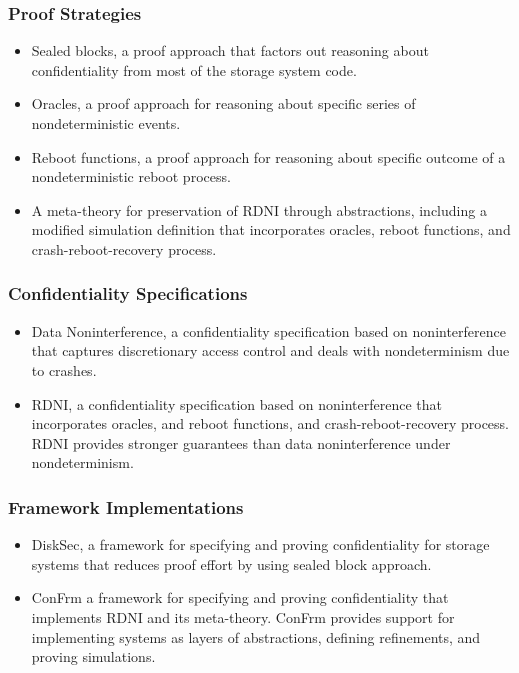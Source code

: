 \subsubsection*{Proof Strategies}
\begin{itemize}
\item Sealed blocks, a proof approach that factors out reasoning about confidentiality
  from most of the storage system code.
  
\item Oracles, a proof approach for reasoning about specific series of nondeterministic events.

\item Reboot functions, a proof approach for reasoning about specific outcome of a nondeterministic reboot process.

\item A meta-theory for preservation of RDNI through abstractions, including a modified simulation definition that incorporates oracles, reboot functions, and crash-reboot-recovery process.
\end{itemize}

\subsubsection*{Confidentiality Specifications}
\begin{itemize}
\item Data Noninterference, a confidentiality specification based on noninterference that captures discretionary access control and deals with nondeterminism due to crashes.

\item RDNI, a confidentiality specification based on noninterference that incorporates oracles, and reboot functions, and crash-reboot-recovery process. RDNI provides stronger guarantees than data noninterference under nondeterminism.
\end{itemize}

\subsubsection*{Framework Implementations}
\begin{itemize}
\item DiskSec, a framework for specifying and proving confidentiality 
for storage systems that reduces proof effort by using sealed block approach.

\item ConFrm a framework for specifying and proving confidentiality that implements RDNI and its meta-theory. ConFrm provides support for implementing systems as layers of abstractions, defining refinements, and proving simulations.

\end{itemize}

